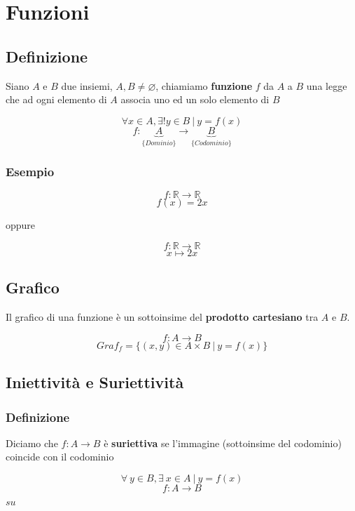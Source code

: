 \section{Funzioni}
\subsection{Definizione}
Siano $A$ e $B$ due insiemi, $A,B \neq \varnothing$, chiamiamo \textbf{funzione} $f$ da $A$ a $B$
una legge che ad ogni elemento di $A$ associa uno ed un solo elemento di $B$
\begin{Large}
    \[
        \forall x \in A, \exists! y \in B\ |\ y = f(x)    
    \]
    \vspace{-1em}
    \[
        f: \underbrace{A}_{\{Dominio\}} \rightarrow \underbrace{B}_{\{Codominio\}}
    \]
\end{Large}
\subsubsection*{Esempio}
    \begin{Large}
        \[
            f: \mathbb{R} \rightarrow \mathbb{R}    
        \]
        \[
            f(x) = 2x    
        \]
    \end{Large}
    oppure
    \begin{Large}
        \[
            f: \mathbb{R} \rightarrow \mathbb{R}
        \]
        \[
            x \mapsto 2x
        \]
    \end{Large}

\subsection{Grafico}
    Il grafico di una funzione è un sottoinsime del \textbf{prodotto cartesiano} tra $A$ e $B$.
    \begin{Large}
        \[
            f:A \rightarrow B
        \]
        \[
            Graf_{f}= \{(x,y) \in A \times B\ |\ y=f(x)\}
        \]
    \end{Large}
\subsection{Iniettività e Suriettività}
    \subsubsection*{Definizione}
        Diciamo che $f:A\rightarrow B$ è \textbf{suriettiva} se l'immagine (sottoinsime del codominio) coincide
        con il codominio
        \begin{large}
            \[
                \forall\ y \in B, \exists\ x \in A\ |\ y = f(x)    
            \]
            \[
                f:A \rightarrow B
            \]
        \end{large}
        \vspace{-7ex}
        \begin{center}
            \begin{small}
                \hspace{0.5cm}$su$
            \end{small}
        \end{center}
